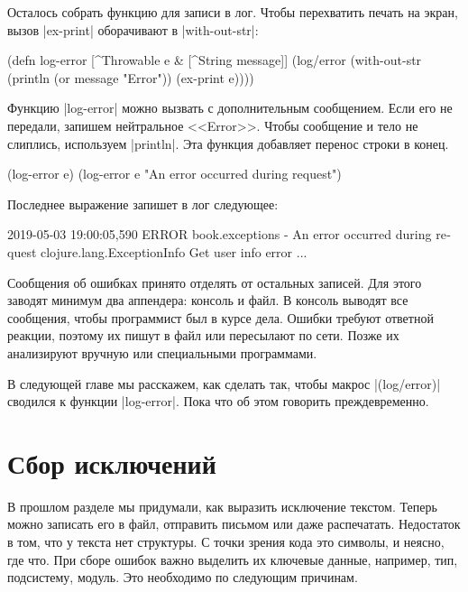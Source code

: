 Осталось собрать функцию для записи в лог. Чтобы перехватить печать на экран,
вызов \spverb|ex-print| оборачивают в \spverb|with-out-str|:

\begin{english}
  \begin{clojure}
(defn log-error
  [^Throwable e & [^String message]]
  (log/error
   (with-out-str
     (println (or message "Error"))
     (ex-print e))))
  \end{clojure}
\end{english}

Функцию \spverb|log-error| можно вызвать с дополнительным сообщением. Если его
не передали, запишем нейтральное <<Error>>. Чтобы сообщение и тело не слиплись,
используем \spverb|println|. Эта функция добавляет перенос строки в конец.

\begin{english}
  \begin{clojure}
(log-error e)
(log-error e "An error occurred during request")
  \end{clojure}
\end{english}

Последнее выражение запишет в лог следующее:

\begin{english}
  \begin{text}
2019-05-03 19:00:05,590 ERROR book.exceptions - An error occurred during request
clojure.lang.ExceptionInfo
  Get user info error
  ...
  \end{text}
\end{english}

Сообщения об ошибках принято отделять от остальных записей. Для этого заводят
минимум два аппендера: консоль и файл. В консоль выводят все сообщения, чтобы
программист был в курсе дела. Ошибки требуют ответной реакции, поэтому их пишут
в файл или пересылают по сети. Позже их анализируют вручную или специальными
программами.

В следующей главе мы расскажем, как сделать так, чтобы макрос
\spverb|(log/error)| сводился к функции \spverb|log-error|. Пока что об этом
говорить преждевременно.

\section{Сбор исключений}

В прошлом разделе мы придумали, как выразить исключение текстом. Теперь можно
записать его в файл, отправить письмом или даже распечатать. Недостаток в том,
что у текста нет структуры. С точки зрения кода это символы, и неясно, где что.
При сборе ошибок важно выделить их ключевые данные, например, тип, подсистему,
модуль. Это необходимо по следующим причинам.

